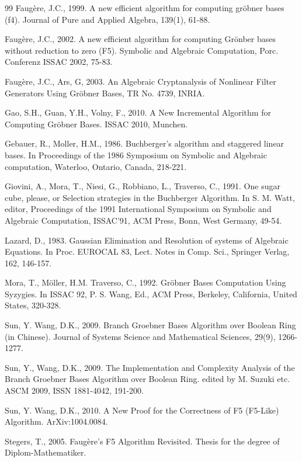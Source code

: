 \documentclass[preprint,authoryear,3p,12pt]{elsarticle}
\def\gr{{Gr\"obner }}
\begin{document}
\begin{thebibliography}{99}
Faug\`ere, J.C., 1999.  A new efficient algorithm for computing
gr\"obner bases (f4). Journal of Pure and Applied Algebra, 139(1),
61-88.

Faug\`ere, J.C., 2002. A new efficient algorithm for computing
Gr\"onber bases without reduction to zero (F5). Symbolic and
Algebraic Computation, Porc. Conferenz ISSAC 2002, 75-83.

Faug\`ere, J.C., Ars, G, 2003. An Algebraic Cryptanalysis of
Nonlinear Filter Generators Using \gr Bases, TR No. 4739, INRIA.


Gao, S.H., Guan, Y.H., Volny, F., 2010. A New Incremental
Algorithm for Computing \gr Bases. ISSAC 2010, Munchen.

Gebauer, R., Moller, H.M., 1986. Buchberger's algorithm and
staggered linear bases. In Proceedings of the 1986 Symposium on
Symbolic and Algebraic computation, Waterloo, Ontario, Canada,
218-221.

Giovini, A., Mora, T., Niesi, G., Robbiano, L., Traverso, C.,
1991. One sugar cube, please, or Selection strategies in the
Buchberger Algorithm. In S. M. Watt, editor, Proceedings of the
1991 International Symposium on Symbolic and Algebraic
Computation, ISSAC'91, ACM Press,  Bonn, West Germany, 49-54.

Lazard, D., 1983. Gaussian Elimination and Resolution of systems
of Algebraic Equations. In Proc. EUROCAL 83, Lect. Notes in Comp.
Sci., Springer Verlag, 162, 146-157.

Mora, T., M\"oller, H.M. Traverso, C., 1992. \gr Bases Computation
Using Syzygies. In ISSAC 92, P. S. Wang, Ed., ACM Press, Berkeley,
California, United States, 320-328.

Sun, Y. Wang, D.K., 2009. Branch Groebner Bases Algorithm over
Boolean Ring (in Chinese). Journal of Systems Science and
Mathematical Sciences, 29(9), 1266-1277.

Sun, Y., Wang, D.K., 2009. The Implementation and Complexity
Analysis of the Branch Groebner Bases Algorithm over Boolean Ring.
edited by M. Suzuki etc. ASCM 2009, ISSN 1881-4042, 191-200.

Sun, Y. Wang, D.K., 2010. A New Proof for the Correctness of F5
(F5-Like) Algorithm. ArXiv:1004.0084.

Stegers, T., 2005. Faug\`ere's F5 Algorithm Revisited. Thesis for
the degree of Diplom-Mathematiker.

\end{thebibliography}
\end{document}
